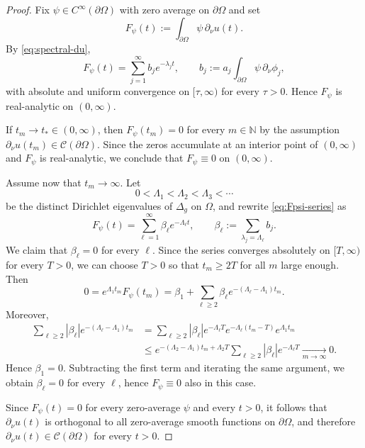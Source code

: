 \documentclass[10pt,a4paper]{amsart}
\begin{document}
\begin{proof}
Fix $\psi\in C^\infty(\partial\Omega)$ with zero average on $\partial\Omega$ and
set
\[
F_\psi(t):=\int_{\partial\Omega}\psi\,\partial_\nu u(t).
\]
By \eqref{eq:spectral-du},
\begin{equation}\label{eq:Fpsi-series}
F_\psi(t)=\sum_{j=1}^\infty b_j e^{-\lambda_j t},
\qquad
b_j:=a_j\int_{\partial\Omega}\psi\,\partial_\nu\phi_j,
\end{equation}
with absolute and uniform convergence on $[\tau,\infty)$ for every $\tau>0$.
Hence $F_\psi$ is real-analytic on $(0,\infty)$.

If $t_m\to t_\ast\in(0,\infty)$, then $F_\psi(t_m)=0$ for every $m\in\mathbb{N}$ by the
assumption $\partial_\nu u(t_m)\in\mathcal C(\partial\Omega)$. Since the
zeros accumulate at an interior point of $(0,\infty)$ and $F_\psi$ is
real-analytic, we conclude that $F_\psi\equiv 0$ on $(0,\infty)$.

Assume now that $t_m\to\infty$. Let
\[
0<\Lambda_1<\Lambda_2<\Lambda_3<\cdots
\]
be the distinct Dirichlet eigenvalues of $\Delta_g$ on $\Omega$, and rewrite
\eqref{eq:Fpsi-series} as
\[
F_\psi(t)=\sum_{\ell=1}^\infty \beta_\ell e^{-\Lambda_\ell t},
\qquad
\beta_\ell:=\sum_{\lambda_j=\Lambda_\ell} b_j.
\]
We claim that $\beta_\ell=0$ for every $\ell$. Since the series converges
absolutely on $[T,\infty)$ for every $T>0$, we can choose $T>0$ so that
$t_m\geq 2T$ for all $m$ large enough. Then
\[
0=e^{\Lambda_1 t_m}F_\psi(t_m)
=\beta_1+\sum_{\ell\geq 2}\beta_\ell e^{-(\Lambda_\ell-\Lambda_1)t_m}.
\]
Moreover,
\begin{align*}
\sum_{\ell\geq 2} |\beta_\ell| e^{-(\Lambda_\ell-\Lambda_1)t_m}
&=
\sum_{\ell\geq 2} |\beta_\ell| e^{-\Lambda_\ell T}
e^{-\Lambda_\ell(t_m-T)}e^{\Lambda_1 t_m}\\
&\leq
e^{-(\Lambda_2-\Lambda_1)t_m+\Lambda_2 T}
\sum_{\ell\geq 2} |\beta_\ell|e^{-\Lambda_\ell T}\xrightarrow[m\to\infty]{}0.
\end{align*}
Hence $\beta_1=0$. Subtracting the first term and iterating the same argument,
we obtain $\beta_\ell=0$ for every $\ell$, hence $F_\psi\equiv 0$ also in this
case.

Since $F_\psi(t)=0$ for every zero-average $\psi$ and every $t>0$, it follows
that $\partial_\nu u(t)$ is orthogonal to all zero-average smooth
functions on $\partial\Omega$, and therefore
$\partial_\nu u(t)\in\mathcal C(\partial\Omega)$ for every $t>0$.
\end{proof}
\end{document}

